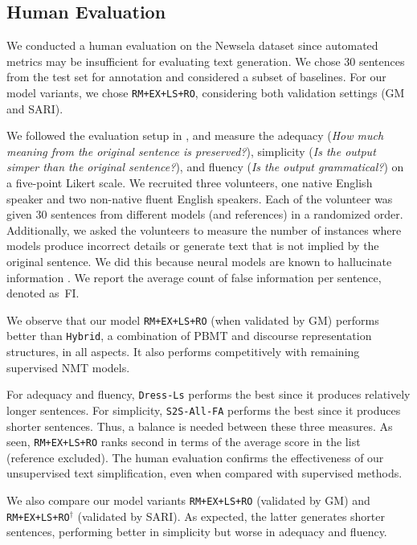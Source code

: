\documentclass[11pt,a4paper]{article}
\begin{document}
\subsection{Human Evaluation}

We conducted a human evaluation on the Newsela dataset  since automated metrics may be insufficient for evaluating text generation. We chose 30 sentences from the test set for annotation and considered a subset of baselines. For our model variants, we chose {\tt RM+EX+LS+RO}, considering both validation settings (GM and SARI). 

We followed the evaluation setup in , and measure the adequacy (\textit{How much meaning from the original sentence is preserved?}), simplicity (\textit{Is the output simper than the original sentence?}), and fluency (\textit{Is the output grammatical?}) on a five-point Likert scale.  We recruited three volunteers, one native English speaker and two non-native fluent English speakers. Each of the volunteer was given 30 sentences from different models (and references) in a randomized order. Additionally, we asked the volunteers to measure the number of instances where models produce incorrect details or generate text that is not implied by the original sentence.
We did this because neural models are known to hallucinate information \cite{rohrbach2018object}.
We report the average count of false information per sentence, denoted as~FI.



We observe that our model {\tt RM+EX+LS+RO} (when validated by GM) performs better than {\tt Hybrid}, a combination of PBMT and discourse representation structures, in all aspects. It also performs competitively with remaining supervised NMT models. 

For adequacy and fluency, {\tt Dress-Ls} performs the best since it produces relatively longer sentences. For simplicity, {\tt S2S-All-FA} performs the best since it produces shorter sentences. 
Thus, a balance is needed between these three measures. As seen, {\tt RM+EX+LS+RO} ranks second in terms of the average score in the list (reference excluded). The human evaluation confirms the effectiveness of our unsupervised text simplification, even when compared with supervised methods. 


We also compare our model variants {\tt RM+EX+LS+RO} (validated by GM) and {\tt RM+EX+LS+RO$^{\dagger}$} (validated by SARI). As expected, the latter generates shorter sentences, performing better in simplicity but worse in adequacy and fluency. 
\end{document}
